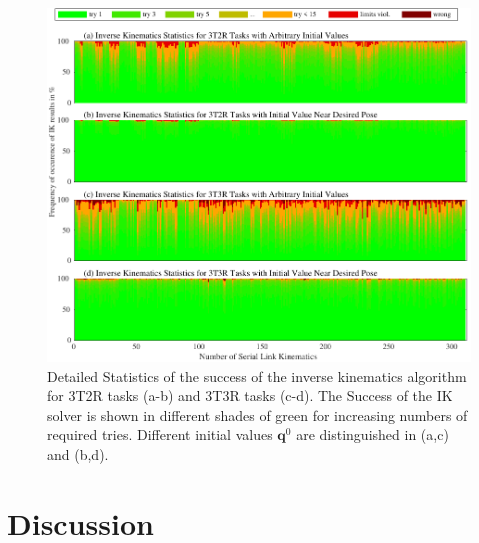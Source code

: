 \documentclass[robotics,article,submit,moreauthors,pdftex]{Definitions/mdpi}
\newcommand{\bm}[1]{\boldsymbol{#1}}
\begin{document}
\begin{figure}[tb]
    \includegraphics{serrob_ik_hist_all.pdf}
    \caption{Detailed Statistics of the success of the inverse kinematics algorithm for 3T2R tasks (a-b) and 3T3R tasks (c-d). The Success of the IK solver is shown in different shades of green for increasing numbers of required tries. Different initial values $\bm{q}^0$ are distinguished in (a,c) and (b,d).}
    \label{fig:serrob_ik_hist}
\end{figure} 


\section{Discussion}

\end{document}
